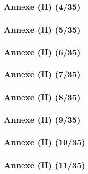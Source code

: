 \documentclass{beamer}
\begin{document}
{\begin{frame}
\frametitle{Annexe (II) (4/35)}



\end{frame}

\begin{frame}
\frametitle{Annexe (II) (5/35)}



\end{frame}

\begin{frame}
\frametitle{Annexe (II) (6/35)}



\end{frame}

\begin{frame}
\frametitle{Annexe (II) (7/35)}



\end{frame}

\begin{frame}
\frametitle{Annexe (II) (8/35)}



\end{frame}

\begin{frame}
\frametitle{Annexe (II) (9/35)}



\end{frame}

\begin{frame}
\frametitle{Annexe (II) (10/35)}



\end{frame}

\begin{frame}
\frametitle{Annexe (II) (11/35)}


\end{frame}}
\end{document}
